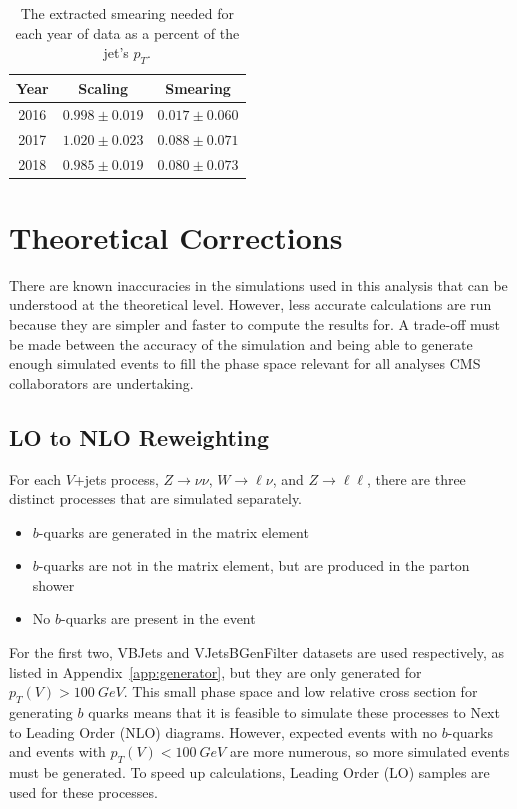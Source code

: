 \begin{table}
  \centering
  \caption[$b$-jet energy smearing parameters]{
    The extracted smearing needed for each year of data as a percent of the jet's $p_T$.
  }
  \begin{tabular}{c|c|c}
    \hline
    Year & Scaling & Smearing \\
    \hline
    2016 & $0.998 \pm 0.019$ & $0.017 \pm 0.060$ \\
    2017 & $1.020 \pm 0.023$ & $0.088 \pm 0.071$ \\
    2018 & $0.985 \pm 0.019$ & $0.080 \pm 0.073$ \\
    \hline
  \end{tabular}
  \label{tab:jetsmear-res}
\end{table}

\section{Theoretical Corrections}

There are known inaccuracies in the simulations used in this analysis
that can be understood at the theoretical level.
However, less accurate calculations are run because they are simpler
and faster to compute the results for.
A trade-off must be made between the accuracy of the simulation
and being able to generate enough simulated events to fill the phase space
relevant for all analyses CMS collaborators are undertaking.

\subsection{LO to NLO Reweighting}

For each $V$+jets process, $Z\rightarrow\nu\nu$, $W\rightarrow\ell\nu$,
and $Z\rightarrow\ell\ell$, there are three distinct processes that are simulated separately.
\begin{itemize}
\item $b$-quarks are generated in the matrix element
\item $b$-quarks are not in the matrix element, but are produced in the parton shower
\item No $b$-quarks are present in the event
\end{itemize}
For the first two, VBJets and VJetsBGenFilter datasets are used respectively,
as listed in Appendix~\ref{app:generator},
but they are only generated for $p_T(V) > \SI{100}{GeV}$.
This small phase space and low relative cross section for generating $b$ quarks
means that it is feasible to simulate these processes to Next to Leading Order (NLO) diagrams.
However, expected events with no $b$-quarks and events with $p_T(V) < \SI{100}{GeV}$
are more numerous, so more simulated events must be generated.
To speed up calculations, Leading Order (LO) samples are used for these processes.

